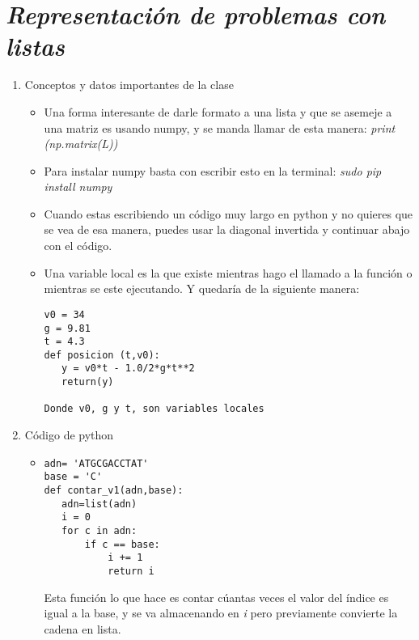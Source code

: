 \documentclass{book}
\begin{document}




\section{\textit{Representación de problemas con listas}}

\begin{flushright}
	\date{24 de enero de 2019\\}
\end{flushright}

\begin{enumerate}
	\item Conceptos y datos importantes de la clase
	\begin{itemize}
		\item Una forma interesante de darle formato a una lista y que se asemeje a una matriz es usando numpy, y se manda llamar de esta manera: \textit{print (np.matrix(L))}\\
		
		
		\item Para instalar numpy basta con escribir esto en la terminal: \textit{sudo pip install numpy}\\
		
		\item Cuando estas escribiendo un código muy largo en python y no quieres que se vea de esa manera, puedes usar la diagonal invertida y continuar abajo con el código.\\
		
		\item Una variable local es la que existe mientras hago el llamado a la función o mientras se este ejecutando. Y quedaría de la siguiente manera:  \begin{lstlisting}
v0 = 34
g = 9.81
t = 4.3
def posicion (t,v0):
   y = v0*t - 1.0/2*g*t**2
   return(y)
		
Donde v0, g y t, son variables locales			
		\end{lstlisting}
		
		
		
	\end{itemize}
	
	
	
	\item Código de python
	\begin{itemize}
		\item \begin{lstlisting}
adn= 'ATGCGACCTAT'
base = 'C'				
def contar_v1(adn,base):
   adn=list(adn)
   i = 0
   for c in adn:
       if c == base:
           i += 1
           return i
		\end{lstlisting} Esta función lo que hace es contar cúantas veces el valor del índice es igual a la base, y se va almacenando en \textit{i} pero previamente convierte la cadena en lista.\\
		

\end{itemize}
\end{enumerate}
\end{document}
